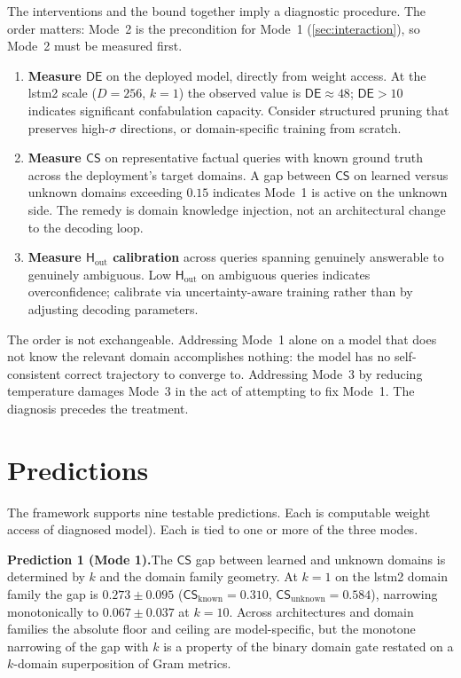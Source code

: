 \documentclass[11pt,a4paper]{article}
\newcommand{\CS}{\mathsf{CS}}
\newcommand{\DE}{\mathsf{DE}}
\newcommand{\Hout}{\mathsf{H}_{\mathrm{out}}}
\begin{document}
The interventions and the bound together imply a diagnostic procedure. The order matters: Mode~2 is the precondition for Mode~1 (\ref{sec:interaction}), so Mode~2 must be measured first.

\begin{enumerate}[nosep]
\item \textbf{Measure $\DE$} on the deployed model, directly from weight access. At the lstm2 scale ($D = 256$, $k = 1$) the observed value is $\DE \approx 48$; $\DE > 10$ indicates significant confabulation capacity. Consider structured pruning that preserves high-$\sigma$ directions, or domain-specific training from scratch.
\item \textbf{Measure $\CS$} on representative factual queries with known ground truth across the deployment's target domains. A gap between $\CS$ on learned versus unknown domains exceeding $0.15$ indicates Mode~1 is active on the unknown side. The remedy is domain knowledge injection, not an architectural change to the decoding loop.
\item \textbf{Measure $\Hout$ calibration} across queries spanning genuinely answerable to genuinely ambiguous. Low $\Hout$ on ambiguous queries indicates overconfidence; calibrate via uncertainty-aware training rather than by adjusting decoding parameters.
\end{enumerate}

The order is not exchangeable. Addressing Mode~1 alone on a model that does not know the relevant domain accomplishes nothing: the model has no self-consistent correct trajectory to converge to. Addressing Mode~3 by reducing temperature damages Mode~3 in the act of attempting to fix  Mode~1. The diagnosis precedes the treatment.

\newpage

\section{Predictions}
\label{sec:predictions}

The framework supports nine testable predictions. Each is computable weight access of diagnosed model). Each is tied to one or more of the three modes.

\begin{mdframed}[backgroundcolor=mode1bg, linecolor=mode1col, linewidth=1pt]
\textbf{Prediction 1 (Mode 1).}\quad The $\CS$ gap between learned and unknown domains is determined by $k$ and the domain family geometry. At $k = 1$ on the lstm2 domain family the gap is $0.273 \pm 0.095$ ($\CS_{\mathrm{known}} = 0.310$, $\CS_{\mathrm{unknown}} = 0.584$), narrowing monotonically to $0.067 \pm 0.037$ at $k = 10$. Across architectures and domain families the absolute floor and ceiling are model-specific, but the monotone narrowing of the gap with $k$ is a property of the binary domain gate restated on a $k$-domain superposition of Gram metrics.
\end{mdframed}
\end{document}
